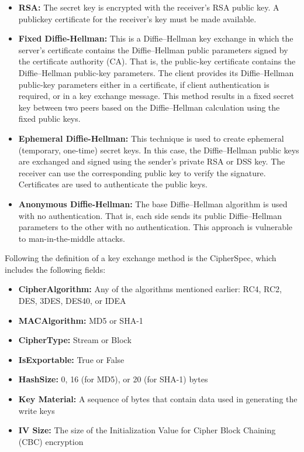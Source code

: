 \documentclass[11pt]{article}
\begin{document}
\begin{enumerate}
    \begin{itemize}
        \item \textbf{RSA:} The secret key is encrypted with the receiver’s RSA public key. A publickey certificate for the receiver’s key must be made available.
        \item \textbf{Fixed Diffie-Hellman:} This is a Diffie–Hellman key exchange in which the server’s certificate contains the Diffie–Hellman public parameters signed by the certificate authority (CA). That is, the public-key certificate contains the Diffie–Hellman public-key parameters. The client provides its Diffie–Hellman public-key parameters either in a certificate, if client authentication is required, or in a key exchange message. This method results in a fixed secret key between two peers based on the Diffie–Hellman calculation using the fixed public keys.
        \item \textbf{Ephemeral Diffie-Hellman:} This technique is used to create ephemeral (temporary, one-time) secret keys. In this case, the Diffie–Hellman public keys are exchanged and signed using the sender’s private RSA or DSS key. The receiver can use the corresponding public key to verify the signature. Certificates are used to authenticate the public keys.
        \item \textbf{Anonymous Diffie-Hellman:} The base Diffie–Hellman algorithm is used with no authentication. That is, each side sends its public Diffie–Hellman parameters to the other with no authentication. This approach is vulnerable to man-in-the-middle attacks.
    \end{itemize}
    Following the definition of a key exchange method is the CipherSpec, which includes the following fields:
    \begin{itemize}
        \item \textbf{CipherAlgorithm:} Any of the algorithms mentioned earlier: RC4, RC2, DES, 3DES, DES40, or IDEA
        \item \textbf{MACAlgorithm:} MD5 or SHA-1
        \item \textbf{CipherType:} Stream or Block
        \item \textbf{IsExportable:} True or False
        \item \textbf{HashSize:} 0, 16 (for MD5), or 20 (for SHA-1) bytes
        \item \textbf{Key Material:} A sequence of bytes that contain data used in generating the write keys
        \item \textbf{IV Size:} The size of the Initialization Value for Cipher Block Chaining (CBC) encryption
    \end{itemize}


\end{enumerate}
\end{document}

